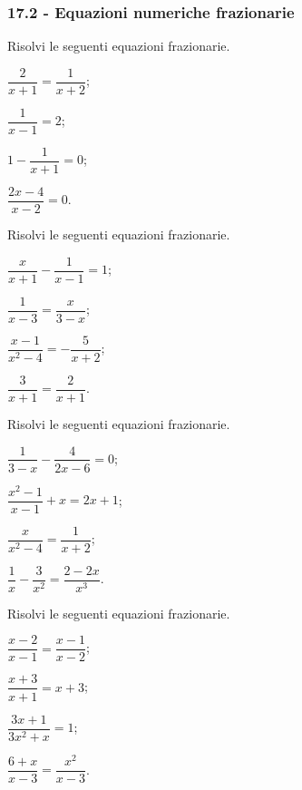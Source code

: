 \subsubsection*{17.2 - Equazioni numeriche frazionarie}

\begin{esercizio}[\Ast]
\label{ese:17.15}
Risolvi le seguenti equazioni frazionarie.
\begin{multicols}{2}
\begin{enumeratea}
 \item $\dfrac{2}{x+1}=\dfrac{1}{x+2}$;
 \item $\dfrac{1}{x-1}=2$;
 \item $1-\dfrac{1}{x+1}=0$;
 \item $\dfrac{2x-4}{x-2}=0$.
\end{enumeratea}
\end{multicols}
\end{esercizio}

\begin{esercizio}[\Ast]
\label{ese:17.16}
Risolvi le seguenti equazioni frazionarie.
\begin{multicols}{2}
\begin{enumeratea}
 \item $\dfrac{x}{x+1}-\dfrac{1}{x-1}=1$;
 \item $\dfrac{1}{x-3}=\dfrac{x}{3-x}$;
 \item $\dfrac{x-1}{x^{2}-4}=-{\dfrac{5}{x+2}}$;
 \item $\dfrac{3}{x+1}=\dfrac{2}{x+1}$.
\end{enumeratea}
\end{multicols}
\end{esercizio}
\begin{esercizio}[\Ast]
\label{ese:17.17}
Risolvi le seguenti equazioni frazionarie.
\begin{multicols}{2}
\begin{enumeratea}
\spazielenx
 \item $\dfrac{1}{3-x}-\dfrac{4}{2x-6}=0$;
 \item $\dfrac{x^{2}-1}{x-1}+x=2x+1$;
 \item $\dfrac{x}{x^{2}-4}=\dfrac{1}{x+2}$;
 \item $\dfrac{1}{x}-\dfrac{3}{x^{2}}=\dfrac{2-2x}{x^{3}}$.
\end{enumeratea}
\end{multicols}
\end{esercizio}

\begin{esercizio}[\Ast]
\label{ese:17.18}
Risolvi le seguenti equazioni frazionarie.
\begin{multicols}{2}
\begin{enumeratea}
\spazielenx
 \item $\dfrac{x-2}{x-1}=\dfrac{x-1}{x-2}$;
 \item $\dfrac{x+3}{x+1}=x+3$;
 \item $\dfrac{3x+1}{3x^{2}+x}=1$;
 \item $\dfrac{6+x}{x-3}=\dfrac{x^{2}}{x-3}$.
\end{enumeratea}
\end{multicols}
\end{esercizio}

